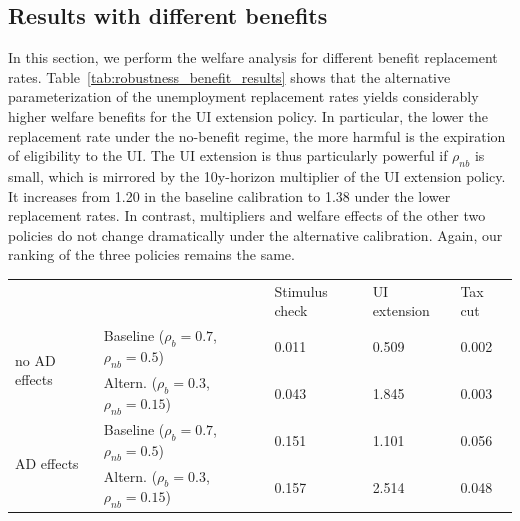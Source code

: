 \documentclass{econsocart}
\begin{document}
\FloatBarrier
\subsection*{Results with different benefits}
\whenintegrated{\label{sec:robust_benefits_results}} %

In this section, we perform the welfare analysis for different benefit replacement rates.
Table~\ref{tab:robustness_benefit_results} shows that the alternative parameterization of the unemployment replacement rates yields considerably higher welfare benefits for the UI extension policy.
In particular, the lower the replacement rate under the no-benefit regime, the more harmful is the expiration of eligibility to the UI.
The UI extension is thus particularly powerful if $\rho_{nb}$ is small, which is mirrored by the 10y-horizon multiplier of the UI extension policy.
It increases from 1.20 in the baseline calibration to 1.38 under the lower replacement rates.
In contrast, multipliers and welfare effects of the other two policies do not change dramatically under the alternative calibration.
Again, our ranking of the three policies remains the same.

\begin{center}
  \begin{tabular}
    {@{}lllll@{}}
    \toprule
                                   &                                                     & Stimulus check & UI extension & Tax cut \\ \cmidrule(l){1-5}
    \multirow{2}{*}{no AD effects} & Baseline  ($\rho_{b}\!=\!0.7$, $\rho_{nb}\!=\!0.5$) & 0.011          & 0.509        & 0.002   \\
                                   & Altern.  ($\rho_{b}\!=\!0.3$, $\rho_{nb}\!=\!0.15$) & 0.043          & 1.845        & 0.003   \\ \cmidrule(l){1-5}
    \multirow{2}{*}{AD effects}    & Baseline  ($\rho_{b}\!=\!0.7$, $\rho_{nb}\!=\!0.5$) & 0.151          & 1.101        & 0.056   \\
                                   & Altern.  ($\rho_{b}\!=\!0.3$, $\rho_{nb}\!=\!0.15$) & 0.157          & 2.514        & 0.048   \\ \cmidrule(l){1-5}
  \end{tabular}
  \label{tab:robustness_benefit_results}
\end{center}
\end{document}
